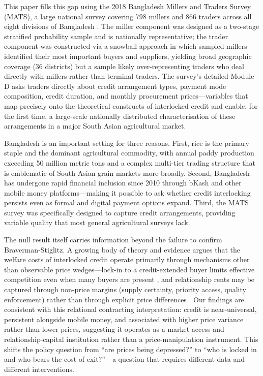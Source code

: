 \documentclass[authoryear,preprint,review,12pt]{elsarticle}
\begin{document}
This paper fills this gap using the 2018 Bangladesh Millers and Traders
Survey (MATS), a large national survey covering 798 millers and 866 traders
across all eight divisions of Bangladesh \citep{dorosh_etal2021}. The miller
component was designed as a two-stage stratified probability sample and is
nationally representative; the trader component was constructed via a snowball
approach in which sampled millers identified their most important buyers and
suppliers, yielding broad geographic coverage (36 districts) but a sample
likely over-representing traders who deal directly with millers rather than
terminal traders. The survey's detailed Module D asks traders directly about
credit arrangement types, payment mode composition, credit duration, and
monthly procurement prices---variables that map precisely onto the theoretical
constructs of interlocked credit and enable, for the first time, a large-scale
nationally distributed characterisation of these arrangements in a major South
Asian agricultural market.

Bangladesh is an important setting for three reasons. First, rice is the
primary staple and the dominant agricultural commodity, with annual paddy
production exceeding 50 million metric tons and a complex multi-tier trading
structure that is emblematic of South Asian grain markets more broadly.
Second, Bangladesh has undergone rapid financial inclusion since 2010 through
bKash and other mobile money platforms---making it possible to ask whether
credit interlocking persists even as formal and digital payment options expand.
Third, the MATS survey was specifically designed to capture credit arrangements,
providing variable quality that most general agricultural surveys lack.

The null result itself carries information beyond the failure to confirm
Braverman-Stiglitz. A growing body of theory and evidence argues that the
welfare costs of interlocked credit operate primarily through mechanisms
other than observable price wedges---lock-in to a credit-extended buyer
limits effective competition even when many buyers are present
\citep{crow_murshid1994}, and relationship rents may be captured through
non-price margins (supply certainty, priority access, quality enforcement)
rather than through explicit price differences \citep{casaburi_macchiavello2019}.
Our findings are consistent with this relational contracting interpretation:
credit is near-universal, persistent alongside mobile money, and associated
with higher price variance rather than lower prices, suggesting it operates
as a market-access and relationship-capital institution rather than a
price-manipulation instrument. This shifts the policy question from ``are
prices being depressed?'' to ``who is locked in and who bears the cost of
exit?''---a question that requires different data and different interventions.
\end{document}
